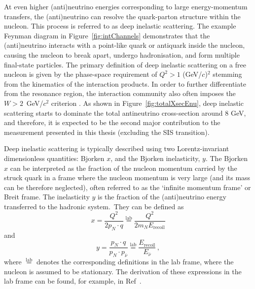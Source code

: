 At even higher (anti)neutrino energies corresponding to large energy-momentum transfers, the (anti)neutrino can resolve the quark-parton structure within the nucleon. This process is referred to as deep inelastic scattering. The example Feynman diagram in Figure~\ref{fig:intChannels} demonstrates that the (anti)neutrino interacts with a point-like quark or antiquark inside the nucleon, causing the nucleon to break apart, undergo hadronisation, and form multiple final-state particles. The primary definition of deep inelastic scattering on a free nucleon is given by the phase-space requirement of $Q^2 > 1$ (GeV/$c$)$^2$ stemming from the kinematics of the interaction products. In order to further differentiate from the resonance region, the interaction community also often imposes the \mbox{$W > 2$~GeV/$c^2$} criterion \cite{Morfin:2022lO}. As shown in Figure~\ref{fig:totalXsecEnu}, deep inelastic scattering starts to dominate the total antineutrino cross-section around 8 GeV, and therefore, it is expected to be the second major contribution to the measurement presented in this thesis (excluding the SIS transition).

Deep inelastic scattering is typically described using two Lorentz-invariant dimensionless quantities: Bjorken $x$, and the Bjorken inelasticity, $y$. The Bjorken $x$ can be interpreted as the fraction of the nucleon momentum carried by the struck quark in a frame where the nucleon momentum is very large (and its mass can be therefore neglected), often referred to as the `infinite momentum frame' or Breit frame. The inelasticity $y$ is the fraction of the (anti)neutrino energy transferred to the hadronic system.~They can be defined as 
\begin{equation}
    \label{eq:bjorkenx}
    x = \frac{Q^2}{2p_{N}\cdot q} \overset{\mathrm{lab}}{=} \frac{Q^2}{2m_{N}E_{\text{recoil}}}
\end{equation}
and
\begin{equation}
    y = \frac{p_{N}\cdot q}{p_{N} \cdot p_{\bar{\nu}}} \overset{\mathrm{lab}}{=} \frac{E_{\text{recoil}}}{E_{\bar{\nu}}} \hspace{2pt} ,
\end{equation}
where $\overset{\mathrm{lab}}{=}$ denotes the corresponding definitions in the lab frame, where the nucleon is assumed to be stationary. The derivation of these expressions in the lab frame can be found, for example, in Ref~\cite{Thomson}.

